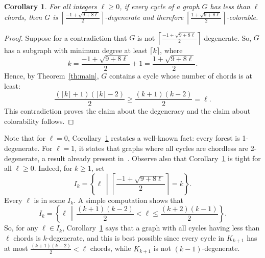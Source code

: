 \documentclass[11pt]{article}
\newtheorem{cor}[theo]{Corollary}
\newcommand{\bea}[1]{\textcolor{magenta}{Bea: #1}}
\begin{document}
    \begin{cor}
        \label{cor:degenerate}
     For all integers $\ell \geq 0$, if every cycle of a graph $G$ has less than $\ell$ chords, then $G$ is $\left\lceil\frac{-1+\sqrt{9+8\ell}}{2}\right\rceil$-degenerate and therefore $\left\lceil\frac{1+\sqrt{9+8\ell}}{2}\right\rceil$-colorable.
    \end{cor}


    \begin{proof}
      Suppose for a contradiction that $G$ is not $\left\lceil\frac{-1+\sqrt{9+8\ell}}{2}\right\rceil$-degenerate. So, $G$ has a subgraph with minimum degree at least $\lceil k\rceil$, where $$k = \frac{-1+\sqrt{9+8\ell}}{2} + 1 = \frac{1+\sqrt{9+8\ell}}{2}.$$ Hence, by Theorem~\ref{th:main}, $G$ contains a cycle whose number of chords is at least:  
      $$\frac{(\lceil k\rceil +1)(\lceil k\rceil - 2)}{2} \geq \frac{( k +1)(k - 2)}{2}  = \ell.$$ This contradiction proves the claim about the degeneracy and the claim about colorability follows.  
    \end{proof}
    

    
    Note that for $\ell=0$, Corollary~\ref{cor:degenerate} restates a well-known fact: every forest is 1-degenerate. For $\ell=1$, it states that graphs where all cycles are chordless are 2-degenerate, a result already present in~\cite{mft:chordless}.  Observe also that Corollary~\ref{cor:degenerate} is tight for all $\ell \geq 0$. Indeed, for $k\geq 1$, set $$I_k = \left\{ \ell \,\middle|\, \left\lceil\frac{-1+\sqrt{9+8\ell}}{2}\right\rceil = k\right\}.$$ Every $\ell$ is in some $I_k$. A simple computation shows that $$I_k = \left\{\ell \,\middle|\, \frac{(k+1)(k-2)}{2} < \ell \leq \frac{(k+2)(k-1)}{2}\right\}.$$ So, for any $\ell\in I_k$, Corollary~\ref{cor:degenerate} says that a graph with all cycles having less than $\ell$ chords is $k$-degenerate, and this is best possible since every cycle in $K_{k+1}$ has at most $\frac{(k+1)(k-2)}{2} < \ell$ chords, while $K_{k+1}$ is not $(k-1)$-degenerate.  
 
\end{document}
